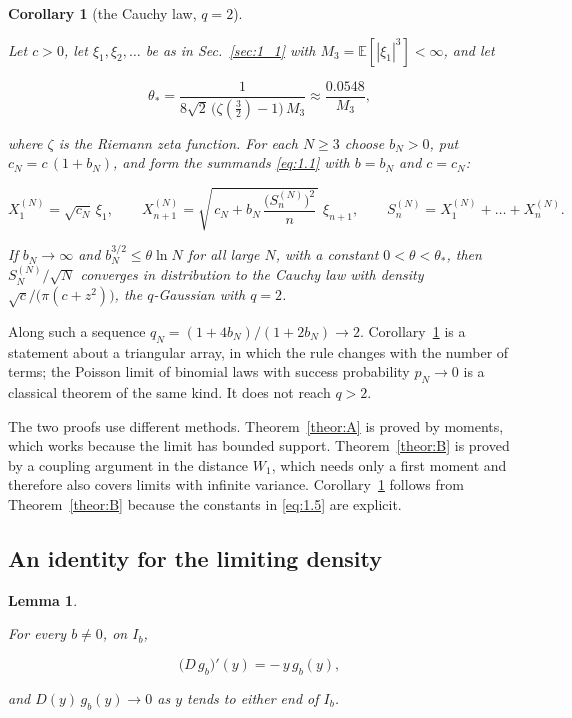 \documentclass[aip,jmp,preprint,onecolumn,floatfix,superscriptaddress,nofootinbib,11pt]{revtex4-2}
\theoremstyle{plain}
\newtheorem{corollaryD}{Corollary}
\newtheorem{lemma}{Lemma}
\theoremstyle{remark}
\numberwithin{equation}{section}
\newcommand{\E}{\mathbb{E}}
\begin{document}
\begin{corollaryD}[the Cauchy law, $q=2$]\label{Corlry:D}
 
Let $c>0$, let $\xi_1,\xi_2,\dots$ be as in Sec.~\ref{sec:1_1} with $M_3=\E[|\xi_1|^{3}]<\infty$, and let
 
\begin{equation}
\theta_*=\frac{1}{8\sqrt2\,\big(\zeta(\tfrac32)-1\big)\,M_3}\approx\frac{0.0548}{M_3},
\label{eq:1.6}
\end{equation}
 
where $\zeta$ is the Riemann zeta function. For each $N\ge3$ choose $b_N>0$, put $c_N=c\,(1+b_N)$, and form the summands \eqref{eq:1.1} with $b=b_N$ and $c=c_N$:
 
\begin{equation*}
X^{(N)}_1=\sqrt{c_N}\,\xi_1,\qquad X^{(N)}_{n+1}=\sqrt{\,c_N+b_N\,\frac{\big(S^{(N)}_n\big)^{2}}{n}\,}\;\xi_{n+1},\qquad S^{(N)}_n=X^{(N)}_1+\dots+X^{(N)}_n .
\end{equation*}
 
If $b_N\to\infty$ and $b_N^{3/2}\le\theta\ln N$ for all large $N$, with a constant $0<\theta<\theta_*$, then $S^{(N)}_N/\sqrt N$ converges in distribution to the Cauchy law with density $\sqrt c/\big(\pi(c+z^{2})\big)$, the $q$-Gaussian with $q=2$.
 
\end{corollaryD}
 
Along such a sequence $q_N=(1+4b_N)/(1+2b_N)\to2$. Corollary~\ref{Corlry:D} is a statement about a triangular array, in which the rule changes with the number of terms; the Poisson limit of binomial laws with success probability $p_N\to0$ is a classical theorem of the same kind. It does not reach $q>2$.
 
The two proofs use different methods. Theorem~\ref{theor:A} is proved by moments, which works because the limit has bounded support. Theorem~\ref{theor:B} is proved by a coupling argument in the distance $W_1$, which needs only a first moment and therefore also covers limits with infinite variance. Corollary~\ref{Corlry:D} follows from Theorem~\ref{theor:B} because the constants in \eqref{eq:1.5} are explicit.
 
\subsection{An identity for the limiting density}\label{sec:2}
 
\begin{lemma}\label{lem:1}
 
For every $b\ne0$, on $I_b$,
 
\begin{equation}
\big(D\,g_b\big)'(y)=-\,y\,g_b(y),
\label{eq:2.1}
\end{equation}
 
and $D(y)\,g_b(y)\to0$ as $y$ tends to either end of $I_b$.
 
\end{lemma}
 
\end{document}
